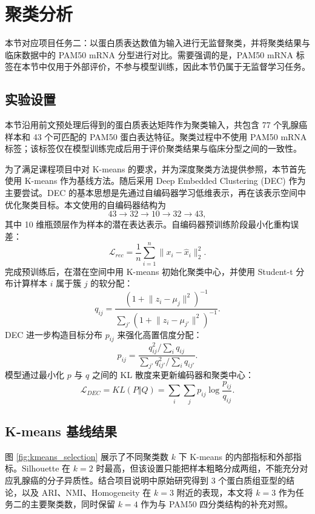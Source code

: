 \section{聚类分析}

\label{sec:clustering}

本节对应项目任务二：以蛋白质表达数值为输入进行无监督聚类，并将聚类结果与临床数据中的 PAM50 mRNA 分型进行对比。需要强调的是，PAM50 mRNA 标签在本节中仅用于外部评价，不参与模型训练，因此本节仍属于无监督学习任务。

\subsection{实验设置}

本节沿用前文预处理后得到的蛋白质表达矩阵作为聚类输入，共包含 77 个乳腺癌样本和 43 个可匹配的 PAM50 蛋白表达特征。聚类过程中不使用 PAM50 mRNA 标签；该标签仅在模型训练完成后用于评价聚类结果与临床分型之间的一致性。

为了满足课程项目中对 K-means 的要求，并为深度聚类方法提供参照，本节首先使用 K-means 作为基线方法。随后采用 Deep Embedded Clustering (DEC) 作为主要尝试。DEC 的基本思想是先通过自编码器学习低维表示，再在该表示空间中优化聚类目标。本文使用的自编码器结构为
\[
43 \rightarrow 32 \rightarrow 10 \rightarrow 32 \rightarrow 43,
\]
其中 10 维瓶颈层作为样本的潜在表达表示。自编码器预训练阶段最小化重构误差：
\[
\mathcal{L}_{rec} = \frac{1}{n}\sum_{i=1}^{n}\lVert x_i-\hat{x}_i\rVert_2^2.
\]
完成预训练后，在潜在空间中用 K-means 初始化聚类中心，并使用 Student-t 分布计算样本 \(i\) 属于簇 \(j\) 的软分配：
\[
q_{ij} =
\frac{(1+\lVert z_i-\mu_j\rVert^2)^{-1}}
{\sum_{j'}(1+\lVert z_i-\mu_{j'}\rVert^2)^{-1}}.
\]
DEC 进一步构造目标分布 \(p_{ij}\) 来强化高置信度分配：
\[
p_{ij} =
\frac{q_{ij}^2 / \sum_i q_{ij}}
{\sum_{j'} q_{ij'}^2 / \sum_i q_{ij'}}.
\]
模型通过最小化 \(p\) 与 \(q\) 之间的 KL 散度来更新编码器和聚类中心：
\[
\mathcal{L}_{DEC}=KL(P\Vert Q)=\sum_i\sum_j p_{ij}\log\frac{p_{ij}}{q_{ij}}.
\]

\subsection{K-means 基线结果}

图 \ref{fig:kmeans_selection} 展示了不同聚类数 \(k\) 下 K-means 的内部指标和外部指标。Silhouette 在 \(k=2\) 时最高，但该设置只能把样本粗略分成两组，不能充分对应乳腺癌的分子异质性。结合项目说明中原始研究得到 3 个蛋白质组亚型的结论，以及 ARI、NMI、Homogeneity 在 \(k=3\) 附近的表现，本文将 \(k=3\) 作为任务二的主要聚类数，同时保留 \(k=4\) 作为与 PAM50 四分类结构的补充对照。

